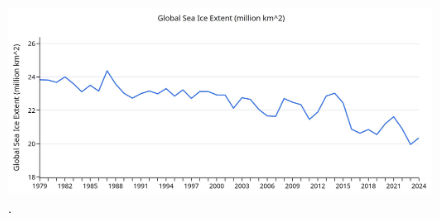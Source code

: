 \documentclass[10pt,twocolumn,letterpaper]{article}
\renewcommand{\refname}{ឯកសារយោង}
\begin{document}
\begin{figure}[t]
\begin{center}
\includegraphics[width=1\textwidth]{ice.jpg}
\end{center}
   \caption{\cite{149}.}
\label{fig:24}
\end{figure}

\clearpage
\twocolumn

{\small


}
\end{document}
